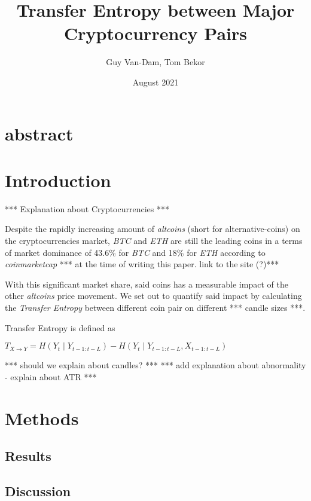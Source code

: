 \documentclass{article}
\title{Transfer Entropy between Major Cryptocurrency Pairs}
\author{Guy Van-Dam, Tom Bekor}
\date{August 2021}
\begin{document}
\maketitle

\section{abstract}
\section{Introduction}

*** Explanation about Cryptocurrencies *** 

Despite the rapidly increasing amount of \emph{altcoins} (short for alternative-coins) on the cryptocurrencies market, \emph{BTC} and \emph{ETH} are still the leading coins in a terms of market dominance of 43.6\% for \emph{BTC} and 18\% for \emph{ETH} according to \emph{coinmarketcap} *** at the time of writing this paper. link to the site (?)***

With this significant market share, said coins has a measurable impact of the other \emph{altcoins} price movement. We set out to quantify said impact by calculating the \emph{Transfer Entropy} between different coin pair on different *** candle sizes ***.

Transfer Entropy is defined as

$T_{X\rightarrow Y} = H\left( Y_t \mid Y_{t-1:t-L}\right) - H\left( Y_t \mid Y_{t-1:t-L}, X_{t-1:t-L}\right)$


*** should we explain about candles? ***
*** add explanation about abnormality - explain about ATR ***

\section{Methods}
\subsection{Results}
\subsection{Discussion}
\end{document}
